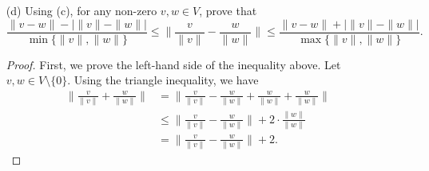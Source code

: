 \documentclass[a4paper]{article}
\begin{document}
\begin{enumerate}
\begin{proof}
        Suppose \( v = cw  \) for some \( c > 0  \). Then observe that 
        \begin{align*}
            \|v + w \| &\leq \|cw\| + \|w \| - \Big(  2 - \Big\| 2 \cdot \frac{ w  }{ \|w\| } \Big\| \Big) \min \{  \|v\|, \|w\| \}  \\
                       &= \|cw\| + \|w\| - \Big( 2 - 2 \cdot \frac{ \|w\| }{ \|w\| }  \Big)\min \{  \|v\|, \|w\|  \} \\
                       &= \|cw\| + \|w\| \\
                       &= (|c| + 1 ) \|w\|.
        \end{align*}
        Similarly, we have 
        \begin{align*}
            \|v + w \| &\geq \|cw\| + \|w \| - \Big(  2 - \Big\| 2 \cdot \frac{ w  }{ \|w\| } \Big\| \Big) \min \{  \|v\|, \|w\| \}  \\
                       &= \|cw\| + \|w\| - \Big( 2 - 2 \cdot \frac{ \|w\| }{ \|w\| }  \Big)\max \{  \|v\|, \|w\|  \} \\
                       &= \|cw\| + \|w\| \\
                       &= (|c| + 1 ) \|w\|.
        \end{align*}
        Hence, equality holds in this case too.
        \end{proof}
    \item[(d)] Using (c), for any non-zero \( v,w \in V  \), prove that 
        \[  \frac{ \|v - w \| - | \|v \| - \|w \| |  }{ \min \{  \|v\|, \|w \| \}  }  \leq \Big\| \frac{ v }{ \|v\| }  - \frac{ w }{ \|w\| } \Big\| \leq \frac{ \|v - w \| + | \|v \| - \|w \| |  }{ \max \{ \|v\|, \|w\| \}  }. \]
        \begin{proof}
        First, we prove the left-hand side of the inequality above. Let \( v,w \in V \setminus  \{  0  \}  \). Using the triangle inequality, we have  
        \begin{align*}
            \Big\|\frac{ v }{ \|v\| }  +  \frac{  w  }{  \|w\| } \Big\| &= \Big\| \frac{ v }{ \|v\|  }  - \frac{ w }{ \|w\| }  + \frac{ w }{ \|w\| }  + \frac{ w }{ \|w\| } \Big\| \\
                                                                        &\leq \Big\| \frac{ v  }{  \|v\| }  - \frac{ w }{ \|w\| } \Big\| + 2 \cdot \frac{ \|w\| }{ \|w\| }  \\
                                                                        &= \Big\|\frac{ v }{ \|v\| }  - \frac{ w }{ \|w\| } \Big\| + 2. 
        \end{align*}

\end{proof}
\end{enumerate}
\end{document}
